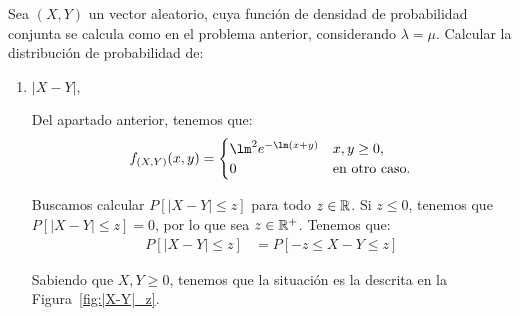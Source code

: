 \begin{ejercicio}
    Sea $(X,Y)$ un vector aleatorio, cuya función de densidad de probabilidad conjunta se calcula como en el problema anterior, considerando $\lambda=\mu$. Calcular la distribución de probabilidad de:
    \begin{enumerate}
        \item $|X-Y|$,

        Del apartado anterior, tenemos que:
        \begin{equation*}
            f_{(X,Y)}(x,y)=\begin{cases}
                \lm^2 e^{-\lm(x+y)} & x,y\geq 0, \\
                0 & \text{en otro caso}.
            \end{cases}
        \end{equation*}

        Buscamos calcular $P[|X-Y|\leq z]$ para todo $z\in\mathbb{R}$.
        Si $z\leq 0$, tenemos que $P[|X-Y|\leq z]=0$, por lo que sea $z\in \mathbb{R}^+$.
        Tenemos que:
        \begin{align*}
            P[|X-Y|\leq z]&=P[-z\leq X-Y\leq z]
        \end{align*}

        Sabiendo que $X,Y\geq 0$, tenemos que la situación es la descrita en la Figura~\ref{fig:|X-Y|_z}.
        \begin{figure}
            \centering
\end{figure}
\end{enumerate}
\end{ejercicio}
